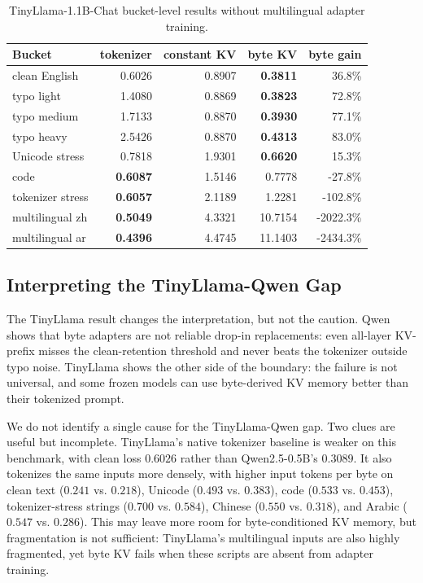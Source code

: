 \documentclass[runningheads]{llncs}
\newcommand{\tinyllama}{TinyLlama-1.1B-Chat}
\begin{document}
\begin{table}[t]
\centering
\caption{\tinyllama{} bucket-level results without multilingual adapter training.}
\label{tab:tinyllama-buckets}
\footnotesize
\setlength{\tabcolsep}{3.2pt}
\begin{tabular}{lrrrr}
\toprule
Bucket & tokenizer & constant KV & byte KV & byte gain \\
\midrule
clean English & 0.6026 & 0.8907 & \textbf{0.3811} & 36.8\% \\
typo light & 1.4080 & 0.8869 & \textbf{0.3823} & 72.8\% \\
typo medium & 1.7133 & 0.8870 & \textbf{0.3930} & 77.1\% \\
typo heavy & 2.5426 & 0.8870 & \textbf{0.4313} & 83.0\% \\
Unicode stress & 0.7818 & 1.9301 & \textbf{0.6620} & 15.3\% \\
code & \textbf{0.6087} & 1.5146 & 0.7778 & -27.8\% \\
tokenizer stress & \textbf{0.6057} & 2.1189 & 1.2281 & -102.8\% \\
multilingual zh & \textbf{0.5049} & 4.3321 & 10.7154 & -2022.3\% \\
multilingual ar & \textbf{0.4396} & 4.4745 & 11.1403 & -2434.3\% \\
\bottomrule
\end{tabular}
\end{table}

\subsection{Interpreting the TinyLlama-Qwen Gap}

The TinyLlama result changes the interpretation, but not the caution. Qwen shows that byte adapters are not reliable drop-in replacements: even all-layer KV-prefix misses the clean-retention threshold and never beats the tokenizer outside typo noise. TinyLlama shows the other side of the boundary: the failure is not universal, and some frozen models can use byte-derived KV memory better than their tokenized prompt.

We do not identify a single cause for the TinyLlama-Qwen gap. Two clues are useful but incomplete. TinyLlama's native tokenizer baseline is weaker on this benchmark, with clean loss $0.6026$ rather than Qwen2.5-0.5B's $0.3089$. It also tokenizes the same inputs more densely, with higher input tokens per byte on clean text ($0.241$ vs. $0.218$), Unicode ($0.493$ vs. $0.383$), code ($0.533$ vs. $0.453$), tokenizer-stress strings ($0.700$ vs. $0.584$), Chinese ($0.550$ vs. $0.318$), and Arabic ($0.547$ vs. $0.286$). This may leave more room for byte-conditioned KV memory, but fragmentation is not sufficient: TinyLlama's multilingual inputs are also highly fragmented, yet byte KV fails when these scripts are absent from adapter training.
\end{document}
